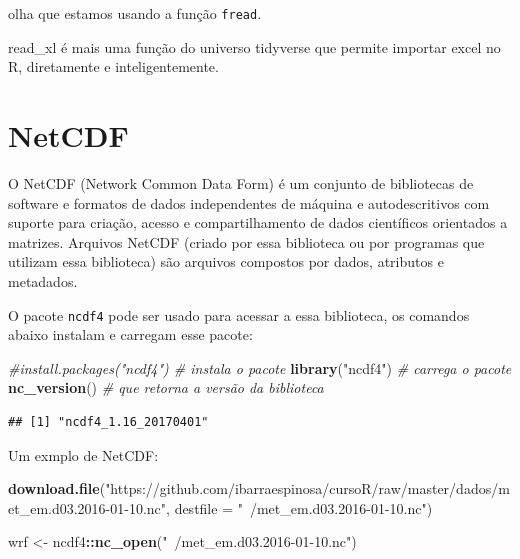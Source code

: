 \documentclass[]{book}
\newenvironment{Shaded}{\begin{snugshade}}{\end{snugshade}}
\newcommand{\KeywordTok}[1]{\textcolor[rgb]{0.13,0.29,0.53}{\textbf{#1}}}
\newcommand{\DataTypeTok}[1]{\textcolor[rgb]{0.13,0.29,0.53}{#1}}
\newcommand{\StringTok}[1]{\textcolor[rgb]{0.31,0.60,0.02}{#1}}
\newcommand{\CommentTok}[1]{\textcolor[rgb]{0.56,0.35,0.01}{\textit{#1}}}
\newcommand{\OperatorTok}[1]{\textcolor[rgb]{0.81,0.36,0.00}{\textbf{#1}}}
\newcommand{\NormalTok}[1]{#1}
\begin{document}
olha que estamos usando a função \texttt{fread}.

read\_xl é mais uma função do universo tidyverse que permite importar
excel no R, diretamente e inteligentemente.

\section{NetCDF}\label{netcdf}

O NetCDF (Network Common Data Form) é um conjunto de bibliotecas de
software e formatos de dados independentes de máquina e autodescritivos
com suporte para criação, acesso e compartilhamento de dados científicos
orientados a matrizes. Arquivos NetCDF (criado por essa biblioteca ou
por programas que utilizam essa biblioteca) são arquivos compostos por
dados, atributos e metadados.

O pacote \texttt{ncdf4} pode ser usado para acessar a essa biblioteca,
os comandos abaixo instalam e carregam esse pacote:

\begin{Shaded}
\begin{Highlighting}[]
\CommentTok{#install.packages("ncdf4") # instala o pacote}
\KeywordTok{library}\NormalTok{(}\StringTok{"ncdf4"}\NormalTok{)          }\CommentTok{# carrega o pacote}
\KeywordTok{nc_version}\NormalTok{()              }\CommentTok{# que retorna a versão da biblioteca}
\end{Highlighting}
\end{Shaded}

\begin{verbatim}
## [1] "ncdf4_1.16_20170401"
\end{verbatim}

Um exmplo de NetCDF:

\begin{Shaded}
\begin{Highlighting}[]
\KeywordTok{download.file}\NormalTok{(}\StringTok{"https://github.com/ibarraespinosa/cursoR/raw/master/dados/met_em.d03.2016-01-10.nc"}\NormalTok{, }\DataTypeTok{destfile =} \StringTok{"~/met_em.d03.2016-01-10.nc"}\NormalTok{)}
\end{Highlighting}
\end{Shaded}

\begin{Shaded}
\begin{Highlighting}[]
\NormalTok{wrf <-}\StringTok{ }\NormalTok{ncdf4}\OperatorTok{::}\KeywordTok{nc_open}\NormalTok{(}\StringTok{"~/met_em.d03.2016-01-10.nc"}\NormalTok{)}
\end{Highlighting}
\end{Shaded}
\end{document}
